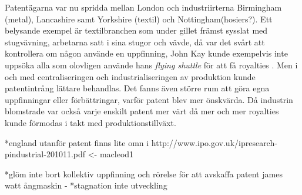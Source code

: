 Patentägarna var nu spridda mellan London och industriirterna Birmingham (metal), Lancashire samt
Yorkshire (textil) och Nottingham(hosiers?). Ett belysande exempel är textilbranchen som under gillet
främst sysslat med stugvävning, arbetarna satt i sina stugor och vävde, då var det svårt att
kontrollera om någon använde en uppfinning, John Kay kunde exempelvis inte uppsöka alla som olovligen
använde hans \emph{flying shuttle} för att få royalties \cite{macleod}. Men i och med centraliseringen och industrialiseringen av produktion kunde patentintrång lättare behandlas. Det fanns även större rum att göra
egna uppfinningar eller förbättringar, varför patent blev mer önskvärda. Då industrin blomstrade var
också varje enskilt patent mer värt då mer och mer royalties kunde förmodas i takt med
produktionstillväxt.


*england utanför patent finns lite omn i http://www.ipo.gov.uk/ipresearch-pindustrial-201011.pdf <- macleod1


*glöm inte bort kollektiv uppfinning och rörelse för att avskaffa patent james watt ångmaskin -
*stagnation inte utveckling


